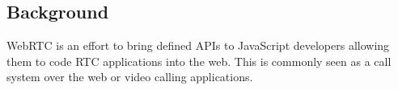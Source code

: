 %
%
%
%

\subsection{Background}

WebRTC is an effort to bring defined APIs to JavaScript developers allowing them to code RTC applications into the web. This is commonly seen as a call system over the web or video calling applications. 

